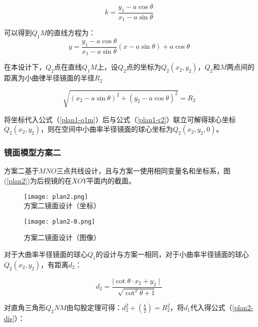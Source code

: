 \documentclass[withoutpreface,bwprint]{cumcmthesis} %
\begin{document}
$$k = \frac{y_1 - a \mathop{cos} \theta}{x_1 - a \mathop{sin} \theta}$$
 
\par 可以得到$Q_1M$的直线方程为：
\begin{equation}
\label{plan1-q1m}
	y = \frac{y_1 - a \mathop{cos} \theta}{x_1 - a \mathop{sin} \theta} (x - a \mathop{sin} \theta ) + a \mathop{cos} \theta
\end{equation}

在本设计下，$Q_2$点在直线$Q_1M$上，设$Q_2$点的坐标为$Q_2(x_2, y_2)$，$Q_2$和$M$两点间的距离为小曲律半径镜面的半径$R_2$

\begin{equation}
\label{plan1-r2}
	\sqrt{(x_2 - a \mathop{sin}\theta )^2 + (y_2 - a \mathop{cos}\theta )^2} = R_2
\end{equation}
\par 将坐标代入公式（\ref{plan1-q1m}）后与公式（\ref{plan1-r2}）联立可解得球心坐标$Q_2(x_2,y_2)$，则在空间中小曲率半径镜面的球心坐标为$Q_2(x_2,y_2,0)$。


\subsubsection{镜面模型方案二}

\par 方案二基于$MNO$三点共线设计，且与方案一使用相同变量名和坐标系，图(\ref{plan2})为后视镜的在$XOY$平面内的截面。


\begin{figure}[!htbp]  
\begin{minipage}[t]{0.5\textwidth}
\centering  
\texttt{[image: plan2.png]} \\
\caption{方案二镜面设计（坐标）} \label{plan2}
\end{minipage}
\hspace{1ex}
\begin{minipage}[t]{0.5\textwidth}  
\centering  
\texttt{[image: plan2-0.png]}\\
\caption{方案二镜面设计（图像）}  \label{plan2-0}
\end{minipage}  
\end{figure} 

\par 对于大曲率半径镜面的球心$Q_1$的设计与方案一相同，对于小曲率半径镜面的球心$Q_2(x_2,y_2)$，有距离$d_2$：

\begin{equation}
	d_2 = \frac{\mid \mathop{cot}\theta \cdot x_2 + y_2 \mid}{\sqrt{\mathop{cot}^{2} \theta + 1}} 
\end{equation}
\par 对直角三角形$Q_2NM$由勾股定理可得：$d_2^2 + \left( \frac{b}{2} \right) = R_2^2$，将$d_1$代入得公式（\ref{plan2-dis}）：
\end{document}
